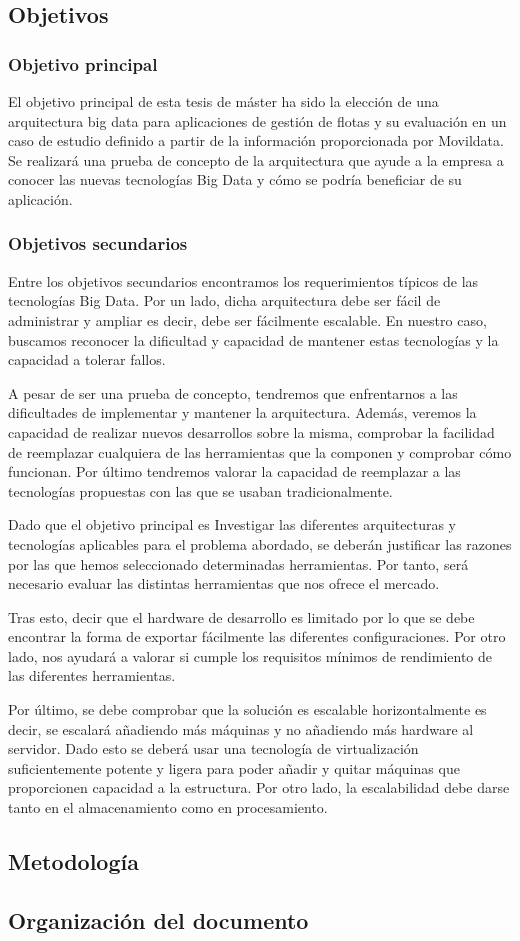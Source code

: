 \subsection{Objetivos}
\subsubsection{Objetivo principal}
El objetivo principal de esta tesis de máster ha sido la elección de una arquitectura big data para aplicaciones de gestión de flotas y su evaluación en un caso de estudio definido a partir de la información proporcionada por Movildata. Se realizará una prueba de concepto de la arquitectura que ayude a la empresa a conocer las nuevas tecnologías Big Data y cómo se podría beneficiar de su aplicación.
\par
\subsubsection{Objetivos secundarios}
Entre los objetivos secundarios encontramos los requerimientos típicos de las tecnologías Big Data. Por un lado, dicha arquitectura debe ser fácil de administrar y ampliar es decir, debe ser fácilmente escalable. En nuestro caso, buscamos reconocer la dificultad y capacidad de mantener estas tecnologías y la capacidad a tolerar fallos.
\par
A pesar de ser una prueba de concepto, tendremos que enfrentarnos a las dificultades de implementar y mantener la arquitectura. Además, veremos la capacidad de realizar nuevos desarrollos sobre la misma, comprobar la facilidad de reemplazar cualquiera de las herramientas que la componen y comprobar cómo funcionan. Por último tendremos valorar la capacidad de reemplazar a las tecnologías propuestas con las que se usaban tradicionalmente.
\par
Dado que el objetivo principal es Investigar las diferentes arquitecturas y tecnologías aplicables para el problema abordado, se deberán justificar las razones por las que hemos seleccionado determinadas herramientas. Por tanto, será necesario evaluar las distintas herramientas que nos ofrece el mercado.
\par	 	 	 	
Tras esto, decir que el hardware de desarrollo es limitado por lo que se debe encontrar la forma de exportar fácilmente las diferentes configuraciones. Por otro lado, nos ayudará a valorar si cumple los requisitos mínimos de rendimiento de las diferentes herramientas.
\par
Por último, se debe comprobar que la solución es escalable horizontalmente es decir, se escalará añadiendo más máquinas y no añadiendo más hardware al servidor. Dado esto se deberá usar una tecnología de virtualización suficientemente potente y ligera para poder añadir y quitar máquinas que proporcionen capacidad a la estructura. Por otro lado, la escalabilidad debe darse tanto en el almacenamiento como en procesamiento.
\par
\subsection{Metodología}

\subsection{Organización del documento}




